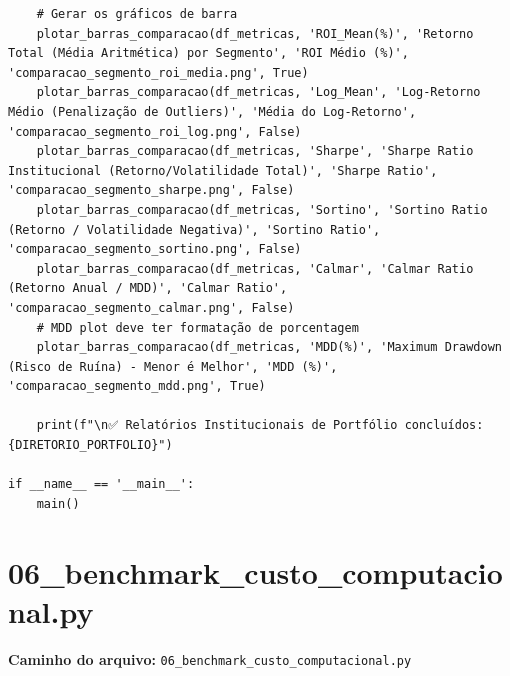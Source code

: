 \documentclass{article}
\begin{document}
\begin{verbatim}
    # Gerar os gráficos de barra
    plotar_barras_comparacao(df_metricas, 'ROI_Mean(%)', 'Retorno Total (Média Aritmética) por Segmento', 'ROI Médio (%)', 'comparacao_segmento_roi_media.png', True)
    plotar_barras_comparacao(df_metricas, 'Log_Mean', 'Log-Retorno Médio (Penalização de Outliers)', 'Média do Log-Retorno', 'comparacao_segmento_roi_log.png', False)
    plotar_barras_comparacao(df_metricas, 'Sharpe', 'Sharpe Ratio Institucional (Retorno/Volatilidade Total)', 'Sharpe Ratio', 'comparacao_segmento_sharpe.png', False)
    plotar_barras_comparacao(df_metricas, 'Sortino', 'Sortino Ratio (Retorno / Volatilidade Negativa)', 'Sortino Ratio', 'comparacao_segmento_sortino.png', False)
    plotar_barras_comparacao(df_metricas, 'Calmar', 'Calmar Ratio (Retorno Anual / MDD)', 'Calmar Ratio', 'comparacao_segmento_calmar.png', False)
    # MDD plot deve ter formatação de porcentagem
    plotar_barras_comparacao(df_metricas, 'MDD(%)', 'Maximum Drawdown (Risco de Ruína) - Menor é Melhor', 'MDD (%)', 'comparacao_segmento_mdd.png', True)
    
    print(f"\n✅ Relatórios Institucionais de Portfólio concluídos: {DIRETORIO_PORTFOLIO}")

if __name__ == '__main__':
    main()
\end{verbatim}

\newpage

\section{06\_benchmark\_custo\_computacional.py}
\textbf{Caminho do arquivo:} \texttt{06\_benchmark\_custo\_computacional.py}
\end{document}

